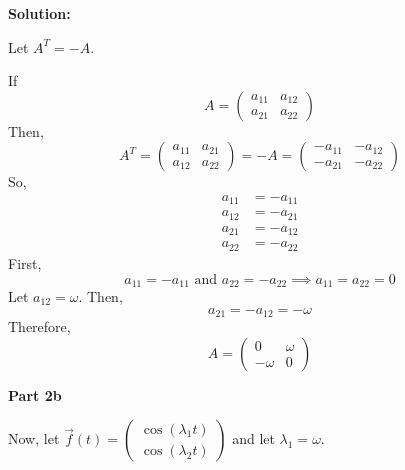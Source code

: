 \documentclass[12pt]{article}
\newenvironment{solution}{
    \textbf{Solution:}
    
}{
    
    \vspace{2em}
}
\begin{document}
\begin{solution}
    Let \(A^T = -A\).

    If
    \[
        A = \begin{pmatrix}
            a_{11} & a_{12} \\
            a_{21} & a_{22}
        \end{pmatrix}
    \]
    Then,
    \[
        A^T = \begin{pmatrix}
            a_{11} & a_{21} \\
            a_{12} & a_{22}
        \end{pmatrix} = -A = \begin{pmatrix}
            -a_{11} & -a_{12} \\
            -a_{21} & -a_{22}
        \end{pmatrix}
    \]
    So,
    \[
        \begin{aligned}
            a_{11} &= -a_{11} \\
            a_{12} &= -a_{21} \\
            a_{21} &= -a_{12} \\
            a_{22} &= -a_{22}
        \end{aligned}
    \]
    First,
    \[
        a_{11} = -a_{11} \text{ and } a_{22} = -a_{22} \implies a_{11} = a_{22} = 0
    \]
    Let \(a_{12} = \omega\). Then,
    \[
        a_{21} = -a_{12} = -\omega
    \]
    Therefore,
    \[
        A = \begin{pmatrix}
            0 & \omega \\
            -\omega & 0
        \end{pmatrix}
    \]

    \textbf{Part 2b}
    
    Now, let \(\vec{f}(t) = \begin{pmatrix} \cos(\lambda_1 t) \\ \cos(\lambda_2 t) \end{pmatrix}\) and let \(\lambda_1 = \omega\).
    

\end{solution}
\end{document}
